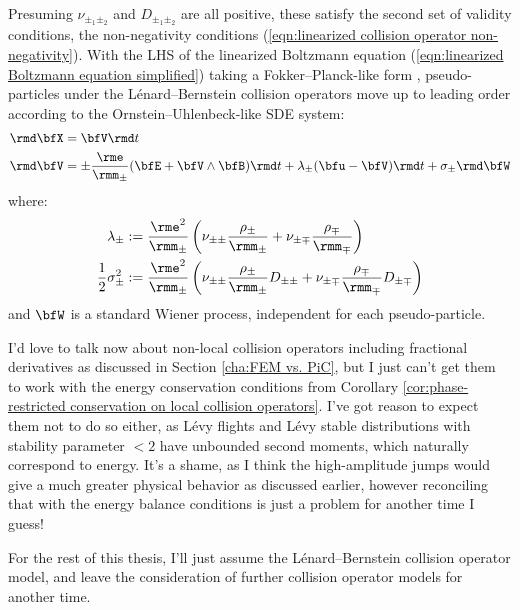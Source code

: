     Presuming $\nu_{\pm_{1}\pm_{2}}$ and $D_{\pm_{1}\pm_{2}}$ are all positive, these satisfy the second set of validity conditions, the non-negativity conditions (\ref{eqn:linearized collision operator non-negativity}). With the LHS of the linearized Boltzmann equation (\ref{eqn:linearized Boltzmann equation simplified}) taking a Fokker--Planck-like form \cite{Fokker_1914, Planck_1917}, pseudo-particles under the Lénard--Bernstein collision operators move up to leading order according to the Ornstein--Uhlenbeck-like \cite{Gardiner_1985, Karatzas_Shreve_1991, Gard_1998} SDE system:
    \begin{align}
        \rmd\bfX  &=  \bfV\rmd t  \\
        \rmd\bfV  &=  \pm\frac{\rme}{\rmm_{\pm}}(\bfE + \bfV\wedge\bfB)\rmd t + \lambda_{\pm}(\bfu - \bfV)\rmd t + \sigma_{\pm}\rmd\bfW
    \end{align}
    where:
    \begin{align}
        \lambda_{\pm}                &:=  \frac{\rme^{2}}{\rmm_{\pm}}\left(\nu_{\pm\pm}\frac{\rho_{\pm}}{\rmm_{\pm}} + \nu_{\pm\mp}\frac{\rho_{\mp}}{\rmm_{\mp}}\right)  \\
        \frac{1}{2}\sigma_{\pm}^{2}  &:=  \frac{\rme^{2}}{\rmm_{\pm}}\left(\nu_{\pm\pm}\frac{\rho_{\pm}}{\rmm_{\pm}}D_{\pm\pm} + \nu_{\pm\mp}\frac{\rho_{\mp}}{\rmm_{\mp}}D_{\pm\mp}\right)
    \end{align}
    and $\bfW$ is a standard Wiener process, independent for each pseudo-particle.

    \begin{remark}
        I'd love to talk now about non-local collision operators including fractional derivatives as discussed in Section \ref{cha:FEM vs. PiC}, but I just can't get them to work with the energy conservation conditions from Corollary \ref{cor:phase-restricted conservation on local collision operators}. I've got reason to expect them not to do so either, as Lévy flights and Lévy stable distributions with stability parameter $< 2$ have unbounded second moments, which naturally correspond to energy. It's a shame, as I think the high-amplitude jumps would give a much greater physical behavior as discussed earlier, however reconciling that with the energy balance conditions is just a problem for another time I guess!

        For the rest of this thesis, I'll just assume the Lénard--Bernstein collision operator model, and leave the consideration of further collision operator models for another time.
    \end{remark}
    
